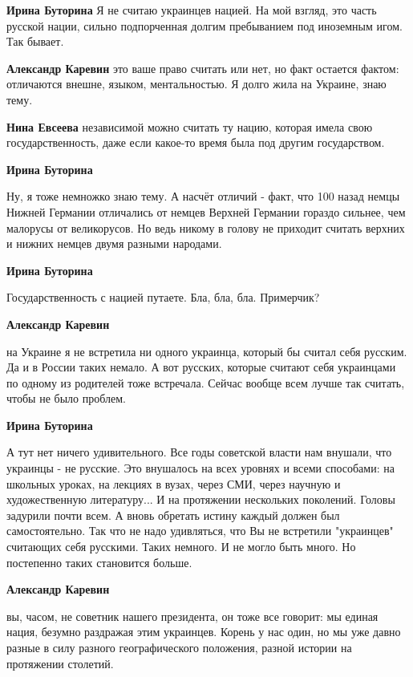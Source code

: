 \begin{itemize}
\begin{itemize}
\textbf{Ирина Буторина} Я не считаю украинцев нацией. На мой взгляд, это часть русской нации, сильно подпорченная долгим пребыванием под иноземным игом. Так бывает.

\textbf{Александр Каревин} это ваше право считать или нет, но факт остается фактом: отличаются внешне, языком, ментальностью. Я долго жила на Украине, знаю тему.

\textbf{Нина Евсеева} независимой можно считать ту нацию, которая имела свою государственность, даже если какое-то время была под другим государством.

\textbf{Ирина Буторина} 

Ну, я тоже немножко знаю тему. А насчёт отличий - факт, что 100 назад немцы
Нижней Германии отличались от немцев Верхней Германии гораздо сильнее, чем
малорусы от великорусов. Но ведь никому в голову не приходит считать верхних и
нижних немцев двумя разными народами.

\textbf{Ирина Буторина} 

Государственность с нацией путаете. Бла, бла, бла. Примерчик?

\textbf{Александр Каревин} 

на Украине я не встретила ни одного украинца, который бы считал себя русским.
Да и в России таких немало. А вот русских, которые считают себя украинцами по
одному из родителей тоже встречала. Сейчас вообще всем лучше так считать, чтобы
не было проблем.

\textbf{Ирина Буторина} 

А тут нет ничего удивительного. Все годы советской власти нам внушали, что
украинцы - не русские. Это внушалось на всех уровнях и всеми способами: на
школьных уроках, на лекциях в вузах, через СМИ, через научную и художественную
литературу... И на протяжении нескольких поколений. Головы задурили почти всем.
А вновь обретать истину каждый должен был самостоятельно. Так что не надо
удивляться, что Вы не встретили "украинцев" считающих себя русскими. Таких
немного. И не могло быть много. Но постепенно таких становится больше.

\textbf{Александр Каревин} 

вы, часом, не советник нашего президента, он тоже все говорит: мы единая нация,
безумно раздражая этим украинцев. Корень у нас один, но мы уже давно разные в
силу разного географического положения, разной истории на протяжении столетий.


\end{itemize}
\end{itemize}
